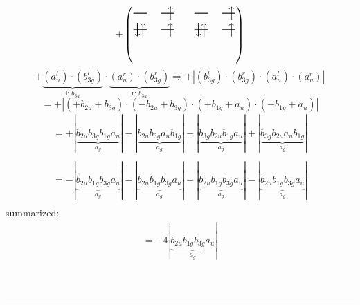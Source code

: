 \documentclass{article}
\begin{document}
\[+\left(\begin{tikzpicture}
    \draw[thick] (0,0) -- (0.5,0); %
    \draw[thick] (1,0) -- (1.5,0); %
    \draw[thick] (0,-0.6) -- (0.5,-0.6); %
    \draw[thick] (1,-0.6) -- (1.5,-0.6); %
\draw[->, thick] (1.35, -0.25) -- (1.35, 0.25); 
\draw[-> , thick] (0.35, -0.85) -- (0.35, -0.35); 
\draw[<- , thick] (0.15, -0.85) -- (0.15, -0.35); 
 \draw[-> , thick] (1.35, -0.85) -- (1.35, -0.35); 
\end{tikzpicture}\qquad \begin{tikzpicture}
    \draw[thick] (0,0) -- (0.5,0); %
    \draw[thick] (1,0) -- (1.5,0); %
    \draw[thick] (0,-0.6) -- (0.5,-0.6); %
    \draw[thick] (1,-0.6) -- (1.5,-0.6); %
\draw[->, thick] (1.35, -0.25) -- (1.35, 0.25); 
\draw[-> , thick] (0.35, -0.85) -- (0.35, -0.35); 
\draw[<- , thick] (0.15, -0.85) -- (0.15, -0.35); 
 \draw[-> , thick] (1.35, -0.85) -- (1.35, -0.35); 
\end{tikzpicture}\right)\]$$+ \underbrace{(a_{u}^{l})\cdot (b_{3g}^{l})}_{\text{l: }b_{3u}}\cdot \underbrace{(a_{u}^{r})\cdot (b_{3g}^{r})}_{\text{r: }b_{3u}}\Rightarrow +\left|(b_{3g}^{l}) \cdot (b_{3g}^{r}) \cdot (a_{u}^{l}) \cdot (a_{u}^{r})\right|$$$$=+\left|(+b_{2u}+b_{3g}) \cdot (-b_{2u}+b_{3g}) \cdot (+b_{1g}+a_{u}) \cdot (-b_{1g}+a_{u})\right|$$\begin{multline*}
=+\left|\underbrace{b_{2u} b_{3g} b_{1g} a_{u}}_{a_{g}}\right|-\left|\underbrace{b_{2u} b_{3g} a_{u} b_{1g}}_{a_{g}}\right|-\left|\underbrace{b_{3g} b_{2u} b_{1g} a_{u}}_{a_{g}}\right|+\left|\underbrace{b_{3g} b_{2u} a_{u} b_{1g}}_{a_{g}}\right|\\
\end{multline*}\begin{multline*}
=-\left|\underbrace{b_{2u} b_{1g} b_{3g} a_{u}}_{a_{g}}\right|-\left|\underbrace{b_{2u} b_{1g} b_{3g} a_{u}}_{a_{g}}\right|-\left|\underbrace{b_{2u} b_{1g} b_{3g} a_{u}}_{a_{g}}\right|-\left|\underbrace{b_{2u} b_{1g} b_{3g} a_{u}}_{a_{g}}\right|\\
\end{multline*}summarized:\begin{multline*}
=-4\left|\underbrace{b_{2u} b_{1g} b_{3g} a_{u}}_{a_{g}}\right|
\end{multline*}\\ \\
\hrule\newpage 
\end{document}
